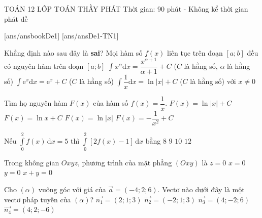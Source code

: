 ﻿\begin{name}
	{\tenchude}
	{TOÁN 12}
	{LỚP TOÁN THẦY PHÁT}
	{Thời gian: 90 phút - Không kể thời gian phát đề}
\end{name}
[ans/ansbookDe1]
\TN
{}[ans/ansDe1-TN1]
\begin{ex}%
Khẳng định nào sau đây là \textbf{sai}?
\choice
{ Mọi hàm số $f(x)$ liên tục trên đoạn $[a;b]$ đều có nguyên hàm trên đoạn $[a;b]$}
{\True $\displaystyle\int x^\alpha \mathrm{d}x=\dfrac{x^{\alpha +1}}{\alpha +1}+C$ ($C$ là hằng số, $\alpha $ là hằng số)}
{$\displaystyle\int \mathrm{e}^x\mathrm{d}x=\mathrm{e}^x+C$ ($C$ là hằng số)}
{$\displaystyle\int{\dfrac{1}{x}\mathrm{d}x=\ln \left| x \right|+C}$ ($C$ là hằng số) với $x\ne 0$}
\end{ex}

\begin{ex}%
Tìm họ nguyên hàm $F(x)$ của hàm số $f(x)=\dfrac{1}{x}$.
\choice
{\True  $F(x)=\ln \left| x \right|+C$}
{$F(x)=\ln x+C$}
{$F(x)=\ln \left| x \right|$}
{$F(x)=-\dfrac{1}{x^2}+C$}
\end{ex}

\begin{ex}%
Nếu $\displaystyle\int\limits_0^2f(x)\mathrm{\,d}x=5$ thì $\displaystyle\int\limits_0^2\left[2f(x)-1\right]\mathrm{\,d}x$ bằng
\choice
{\True $8$}
{$9$}
{$10$}
{$12$}
\end{ex}

\begin{ex}%
Trong không gian $Oxyz$, phương trình của mặt phẳng $(Oxy)$ là
\choice
{\True $z=0$}
{$x=0$}
{$y=0$}
{$x+y=0$}
\end{ex}

\begin{ex}%
Cho $(\alpha)$ vuông góc với giá của $\vec{a}=(-4;2;6)$. Vectơ nào dưới đây là một vectơ pháp tuyến của $(\alpha)$?
\choice
{$\vec{n_1}=(2;1;3)$}
{\True $\vec{n_2}=(-2;1;3)$}
{$\vec{n_3}=(4;-2;6)$}
{$\vec{n_4}=(4;2;-6)$}
\end{ex}

